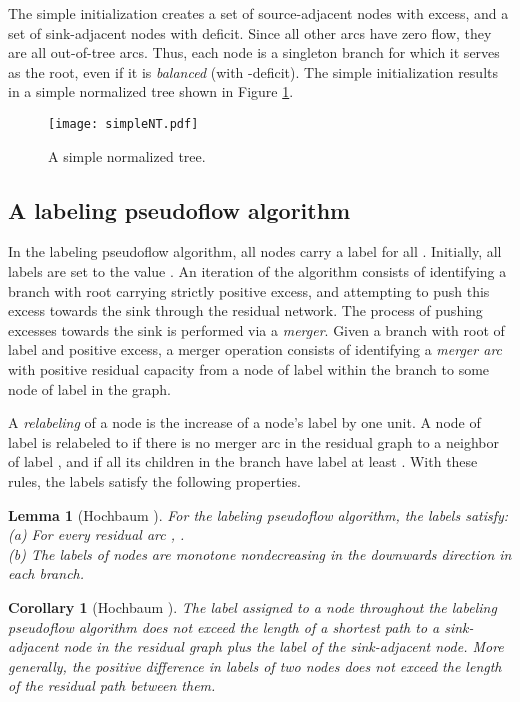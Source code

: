 \documentclass{article}
\newtheorem{lemma}{Lemma}[section]
\newtheorem{corollary}{Corollary}[section]
\begin{document}
The simple initialization creates a set of source-adjacent nodes with excess, and a set of sink-adjacent nodes with deficit.  Since all other arcs have zero flow, they are all out-of-tree arcs. Thus, each node is a singleton branch for which it serves as the root, even if it is {\em balanced} (with -deficit). The simple initialization results in a simple normalized tree shown in Figure \ref{Figure:simpletree}.

\begin{figure}
\centerline{\texttt{[image: simpleNT.pdf]}}
\caption{\label{Figure:simpletree}A simple normalized tree.}
\end{figure}

\subsection{A labeling pseudoflow algorithm}
\label{Section:labelingalgo}

In the labeling pseudoflow algorithm, all nodes carry a label  for all . Initially, all labels are set to the value . An iteration of the algorithm consists of identifying a branch with root carrying strictly positive excess, and attempting to push this excess towards the sink through the residual network. The process of pushing excesses towards the sink is performed via a {\em merger}. Given a branch with root of label  and positive excess, a merger operation consists of identifying a {\em merger arc} with positive residual capacity from a node of label  within the branch to some node of label  in the graph.

A {\em relabeling} of a node is the increase of a node's label by one unit.  A node of label  is relabeled to  if there is no merger arc in the residual graph to a neighbor of label , and if all its children in the branch have label at least . With these rules, the labels satisfy the following properties.

\begin{lemma}[Hochbaum \cite{Hoc97, Hoc07}]
\label{lem:labels}
For the labeling pseudoflow algorithm, the labels satisfy:\\
(a) For every residual arc , .\\
(b) The labels of nodes are monotone nondecreasing in the downwards direction in each branch.
\end{lemma}

\begin{corollary}[Hochbaum \cite{Hoc97, Hoc07}]
\label{cor:res-path} The label assigned to a node throughout the labeling pseudoflow algorithm does not exceed the length of a shortest path to a sink-adjacent node in the residual graph plus the label of the sink-adjacent node.  More generally, the positive difference in labels of two nodes does not exceed the length of the residual path between them.
\end{corollary}
\end{document}
